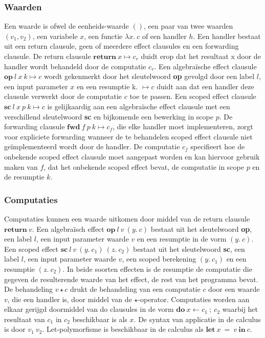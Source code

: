 \subsubsection{Waarden}
Een waarde is ofwel de eenheids-waarde $()$, een paar van twee waarden $(v_{1}, v_{2})$, een variabele $x$, een functie $\lambda x.\:c$ of een handler $h$. Een handler bestaat uit een return clausule, geen of meerdere effect clausules en een forwarding clausule. De return clausule $\textbf{return}\:x \mapsto c_{r}$ duidt erop dat het resultaat x door de handler wordt behandeld door de computatie $c_{r}$. Een algebraïsche effect clausule $\textbf{op}\:l\:x\:k \mapsto c$ wordt gekenmerkt door het sleutelwoord \textbf{op} gevolgd door een label $l$, een input parameter $x$ en een resumptie k. $\mapsto c$ duidt aan dat een handler deze clausule verwerkt door de computatie $c$ toe te passen. Een scoped effect clausule $\textbf{sc}\:l\:x\:p\:k \mapsto c$ is gelijkaardig aan een algebraïsche effect clausule met een verschillend sleutelwoord \textbf{sc} en bijkomende een bewerking in scope $p$. De forwarding clausule $\textbf{fwd}\:f\:p\:k \mapsto c_{f}$, die elke handler moet implementeren, zorgt voor expliciete forwarding wanneer de te behandelen scoped effect clausule niet geïmplementeerd wordt door de handler. De computatie $c_{f}$ specifieert hoe de onbekende scoped effect clausule moet aangepast worden en kan hiervoor gebruik maken van $f$, dat het onbekende scoped effect bevat, de computatie in scope $p$ en de resumptie $k$.

\subsubsection{Computaties}
Computaties kunnen een waarde uitkomen door middel van de return clausule $\textbf{return}\:v$. Een algebraïsch effect $\textbf{op}\:l\:v\:(y.\:c)$ bestaat uit het sleutelwoord \textbf{op}, een label $l$, een input parameter waarde $v$ en een resumptie in de vorm $(y.\:c)$. Een scoped effect $\textbf{sc}\:l\:v\:(y.\:c_{1})\:(z.\:c_{2})$ bestaat uit het sleutelwoord \textbf{sc}, een label $l$, een input parameter waarde $v$, een scoped berekening $(y.\:c_{1})$ en een resumptie $(z.\:c_{2})$. In beide soorten effecten is de resumptie de computatie die gegeven de resulterende waarde van het effect, de rest van het programma bevat. De behandeling $v \star c$ drukt de behandeling van een computatie $c$ door een waarde $v$, die een handler is, door middel van de $\star$-operator. Computaties worden aan elkaar gerijgd doormiddel van do clausules in de vorm $\textbf{do}\:x \leftarrow c_{1}\:;\:c_{2}$ waarbij het resultaat van $c_{1}$ in $c_{2}$ beschikbaar is als $x$. De syntax van applicatie in de calculus is door $v_{1}\:v_{2}$. Let-polymorfisme is beschikbaar in de calculus als $\textbf{let}\:x\:=\:v\:\textbf{in}\:c$.

